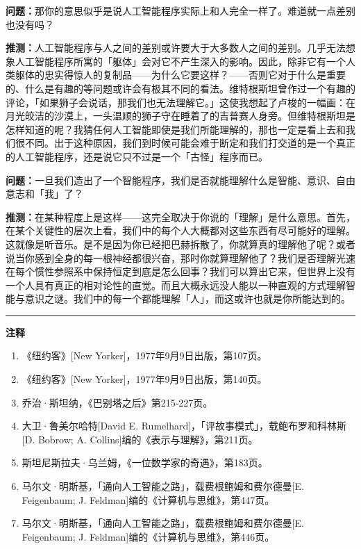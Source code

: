 \documentclass[
  12pt,
  twoside,
  openright,
  oldfontcommands,
]{memoir}
\newcommand{\dialogname}[1]{{\heifamily\bfseries #1}}
\begin{document}
\dialogname{问题：}那你的意思似乎是说人工智能程序实际上和人完全一样了。难道就一点差别也没有吗？

\dialogname{推测：}人工智能程序与人之间的差别或许要大于大多数人之间的差别。几乎无法想象人工智能程序所寓的「躯体」会对它不产生深入的影响。因此，除非它有一个人类躯体的忠实得惊人的复制品------为什么它要这样？------否则它对于什么是重要的、什么是有趣的等问题或许会有极其不同的看法。维特根斯坦曾作过一个有趣的评论，「如果狮子会说话，那我们也无法理解它。」这使我想起了卢梭的一幅画：在月光皎洁的沙漠上，一头温顺的狮子守在睡着了的吉普赛人身旁。但维特根斯坦是怎样知道的呢？我猜任何人工智能即使是我们所能理解的，那也一定是看上去和我们很不同。出于这种原因，我们到时候可能会难于断定和我们打交道的是一个真正的人工智能程序，还是说它只不过是一个「古怪」程序而已。

\dialogname{问题：}一旦我们造出了一个智能程序，我们是否就能理解什么是智能、意识、自由意志和「我」了？

\dialogname{推测：}在某种程度上是这样------这完全取决于你说的「理解」是什么意思。首先，在某个关键性的层次上看，我们中的每个人大概都对这些东西有尽可能好的理解。这就像是听音乐。是不是因为你已经把巴赫拆散了，你就算真的理解他了呢？或者说当你感到全身的每一根神经都很兴奋，那时你就算理解他了？我们是否理解光速在每个惯性参照系中保持恒定到底是怎么回事？我们可以算出它来，但世界上没有一个人具有真正的相对论性的直觉。而且大概永远没人能以一种直观的方式理解智能与意识之谜。我们中的每一个都能理解「人」，而这或许也就是你所能达到的。

{\footnotesize\setlength{\parindent}{0pt}%
\noindent\textcolor{rulegray}{\rule{0.35\linewidth}{0.3pt}}\par\vspace{2pt}
\noindent\textbf{注释}\par\vspace{3pt}
\begin{enumerate}
\label{fn:Chapter19-1}{}
\item 《纽约客》[New Yorker]，1977年9月9日出版，第107页。
\label{fn:Chapter19-2}{}
\item 《纽约客》[New Yorker]，1977年9月9日出版，第140页。
\label{fn:Chapter19-3}{}
\item 乔治·斯坦纳，《巴别塔之后》第215-227页。
\label{fn:Chapter19-4}{}
\item 大卫·鲁美尔哈特[David E. Rumelhard]，「评故事模式」，载鲍布罗和科林斯[D. Bobrow; A. Collins]编的《表示与理解》，第211页。
\label{fn:Chapter19-5}{}
\item 斯坦尼斯拉夫·乌兰姆，《一位数学家的奇遇》，第183页。
\label{fn:Chapter19-6}{}
\item 马尔文·明斯基，「通向人工智能之路」，载费根鲍姆和费尔德曼[E. Feigenbaum; J. Feldman]编的《计算机与思维》，第447页。
\label{fn:Chapter19-7}{}
\item 马尔文·明斯基，「通向人工智能之路」，载费根鲍姆和费尔德曼[E. Feigenbaum; J. Feldman]编的《计算机与思维》，第446页。
\end{enumerate}
}

\label{Dialog20.xhtml}{}
\end{document}
